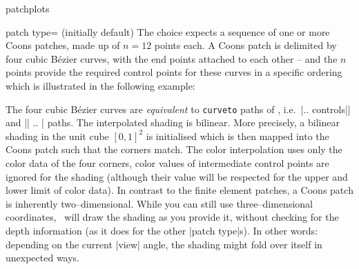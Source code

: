 \begin{pgfplotslibrary}{patchplots}
\begin{pgfplotskey}{patch type= (initially default)}
	The choice  expects a sequence of one or more Coons patches, made up of $n=12$ points each. A Coons patch is delimited by four cubic B\'ezier curves, with the end points attached to each other -- and the $n$ points provide the required control points for these curves in a specific ordering which is illustrated in the following example:
\begin{codeexample}[]
\end{codeexample}
	\noindent The four cubic B\'ezier curves are \emph{equivalent} to \texttt{curveto} paths of \pgfname, i.e.\  |.. controls|| and || .. | paths. The interpolated shading is bilinear. More precisely, a bilinear shading in the unit cube $[0,1]^2$ is initialised which is then mapped into the Coons patch such that the corners match. The color interpolation uses only the color data of the four corners, color values of intermediate control points are ignored for the shading (although their value will be respected for the upper and lower limit of color data). In contrast to the finite element patches, a Coons patch is inherently two--dimensional. While you can still use three--dimensional coordinates, \PGFPlots\ will draw the shading as you provide it, without checking for the depth information (as it does for the other |patch type|s). In other words: depending on the current |view| angle, the shading might fold over itself in unexpected ways.


\end{pgfplotskey}
\end{pgfplotslibrary}
